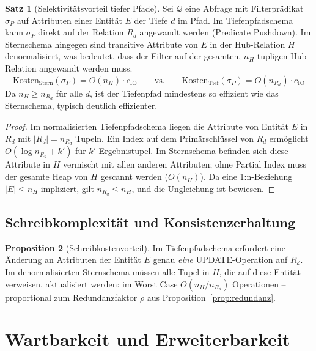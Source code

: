 ﻿\documentclass[12pt,a4paper]{article}
\theoremstyle{definition}
\newtheorem{theorem}{Satz}[section]
\newtheorem{proposition}[theorem]{Proposition}
\theoremstyle{remark}
\begin{document}
\begin{theorem}[Selektivitätsvorteil tiefer Pfade]
\label{thm:selektivitaet}
Sei $\mathcal{Q}$ eine Abfrage mit Filterprädikat $\sigma_P$ auf Attributen
einer Entität $E$ der Tiefe $d$ im Pfad. Im Tiefenpfadschema kann $\sigma_P$
direkt auf der Relation $R_d$ angewandt werden (Predicate Pushdown).
Im Sternschema hingegen sind transitive Attribute von $E$ in der Hub-Relation
$H$ de\-normalisiert, was bedeutet, dass der Filter auf der gesamten,
$n_H$-tupligen Hub-Relation angewandt werden muss.
\[
  \text{Kosten}_{\text{Stern}}(\sigma_P) = O(n_H) \cdot c_{\text{IO}}
  \qquad\text{vs.}\qquad
  \text{Kosten}_{\text{Tief}}(\sigma_P) = O(n_{R_d}) \cdot c_{\text{IO}}
\]
Da $n_H \geq n_{R_d}$ für alle $d$, ist der Tiefenpfad mindestens so
effizient wie das Sternschema, typisch deutlich effizienter.
\end{theorem}

\begin{proof}
Im normalisierten Tiefenpfadschema liegen die Attribute von Entität $E$ in
$R_d$ mit $|R_d| = n_{R_d}$ Tupeln. Ein Index auf dem Primärschlüssel von
$R_d$ ermöglicht $O(\log n_{R_d} + k')$ für $k'$ Ergebnistupel.
Im Sternschema befinden sich diese Attribute in $H$ vermischt mit allen anderen
Attributen; ohne Partial Index muss der gesamte Heap von $H$ gescannt werden
($O(n_H)$). Da eine 1:n-Beziehung $|E| \leq n_H$ impliziert, gilt
$n_{R_d} \leq n_H$, und die Ungleichung ist bewiesen.
\end{proof}

\subsection{Schreibkomplexität und Konsistenzerhaltung}

\begin{proposition}[Schreibkostenvorteil]
Im Tiefenpfadschema erfordert eine Änderung an Attributen der Entität $E$
genau \emph{eine} UPDATE-Operation auf $R_d$. Im denormalisierten
Sternschema müssen alle Tupel in $H$, die auf diese Entität verweisen,
aktualisiert werden: im Worst Case $O(n_H / n_{R_d})$ Operationen --
proportional zum Redundanzfaktor $\rho$ aus Proposition~\ref{prop:redundanz}.
\end{proposition}

\section{Wartbarkeit und Erweiterbarkeit}
\label{sec:wartbarkeit}
\end{document}
